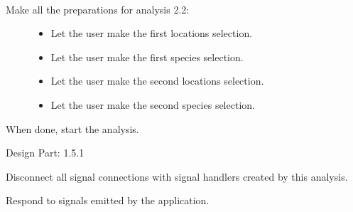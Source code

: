 \documentclass[letterpaper,10pt,english]{sphinxmanual}
\begin{document}
\begin{fulllineitems}
\label{setlyze/analysis/attraction_inter:setlyze.analysis.attraction_inter.Begin}~\begin{description}
\item[{Make all the preparations for analysis 2.2:}] \leavevmode\begin{itemize}
\item {} 
Let the user make the first locations selection.

\item {} 
Let the user make the first species selection.

\item {} 
Let the user make the second locations selection.

\item {} 
Let the user make the second species selection.

\end{itemize}

\end{description}

When done, start the analysis.

Design Part: 1.5.1

\begin{fulllineitems}
\label{setlyze/analysis/attraction_inter:setlyze.analysis.attraction_inter.Begin.destroy_handler_connections}
Disconnect all signal connections with signal handlers created
by this analysis.

\end{fulllineitems}


\begin{fulllineitems}
\label{setlyze/analysis/attraction_inter:setlyze.analysis.attraction_inter.Begin.handle_application_signals}
Respond to signals emitted by the application.

\end{fulllineitems}



\end{fulllineitems}
\end{document}
